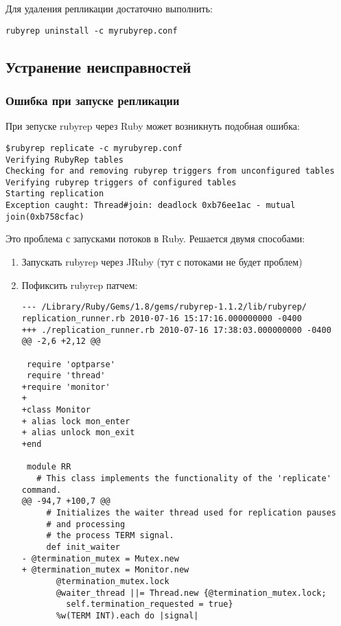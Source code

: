 Для удаления репликации достаточно выполнить:
\begin{lstlisting}[label=lst:rubyrep11,caption=Репликация]
rubyrep uninstall -c myrubyrep.conf
\end{lstlisting}

\subsection{Устранение неисправностей}
\subsubsection{Ошибка при запуске репликации}
При зепуске rubyrep через Ruby может возникнуть подобная ошибка:
\begin{lstlisting}[label=lst:rubyrep12,caption=Устранение неисправностей]
$rubyrep replicate -c myrubyrep.conf 
Verifying RubyRep tables
Checking for and removing rubyrep triggers from unconfigured tables
Verifying rubyrep triggers of configured tables
Starting replication
Exception caught: Thread#join: deadlock 0xb76ee1ac - mutual join(0xb758cfac)
\end{lstlisting}

Это проблема с запусками потоков в Ruby. Решается двумя способами:
\begin{enumerate}
\item Запускать rubyrep через JRuby (тут с потоками не будет проблем)
\item Пофиксить rubyrep патчем:
\begin{lstlisting}[label=lst:rubyrep13,caption=Устранение неисправностей]
--- /Library/Ruby/Gems/1.8/gems/rubyrep-1.1.2/lib/rubyrep/
replication_runner.rb 2010-07-16 15:17:16.000000000 -0400
+++ ./replication_runner.rb 2010-07-16 17:38:03.000000000 -0400
@@ -2,6 +2,12 @@
 
 require 'optparse'
 require 'thread'
+require 'monitor'
+
+class Monitor
+ alias lock mon_enter
+ alias unlock mon_exit
+end
 
 module RR
   # This class implements the functionality of the 'replicate' command.
@@ -94,7 +100,7 @@
     # Initializes the waiter thread used for replication pauses 
     # and processing
     # the process TERM signal.
     def init_waiter
- @termination_mutex = Mutex.new
+ @termination_mutex = Monitor.new
       @termination_mutex.lock
       @waiter_thread ||= Thread.new {@termination_mutex.lock; 
         self.termination_requested = true}
       %w(TERM INT).each do |signal|
\end{lstlisting}
\end{enumerate}